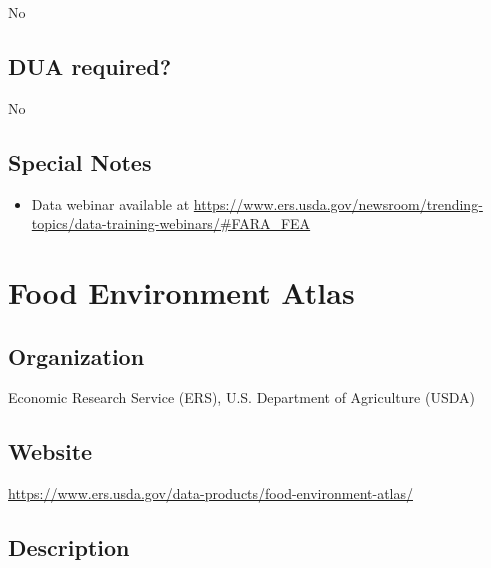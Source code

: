 \documentclass[
]{book}
\providecommand{\tightlist}{%
  \setlength{\itemsep}{0pt}\setlength{\parskip}{0pt}}
\begin{document}
No

\hypertarget{dua-required-26}{%
\section{DUA required?}\label{dua-required-26}}

No

\hypertarget{special-notes-26}{%
\section{Special Notes}\label{special-notes-26}}

\begin{itemize}
\tightlist
\item
  Data webinar available at \url{https://www.ers.usda.gov/newsroom/trending-topics/data-training-webinars/\#FARA_FEA}
\end{itemize}

\mainmatter

\hypertarget{food-environment-atlas}{%
\chapter{Food Environment Atlas}\label{food-environment-atlas}}

\hypertarget{organization-27}{%
\section{Organization}\label{organization-27}}

Economic Research Service (ERS), U.S. Department of Agriculture (USDA)

\hypertarget{website-27}{%
\section{Website}\label{website-27}}

\url{https://www.ers.usda.gov/data-products/food-environment-atlas/}

\hypertarget{description-27}{%
\section{Description}\label{description-27}}
\end{document}
